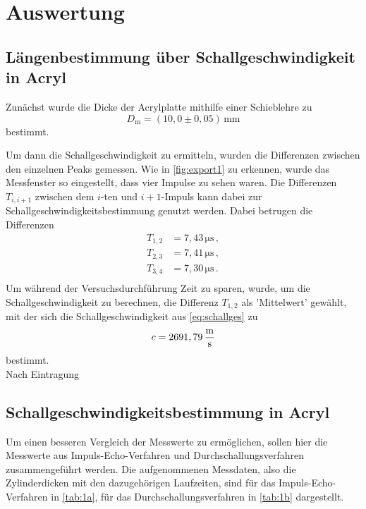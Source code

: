 \section{Auswertung}
\label{sec:auswertung}

\subsection{Längenbestimmung über Schallgeschwindigkeit in Acryl}

Zunächst wurde die Dicke der Acrylplatte mithilfe einer Schieblehre zu
\begin{equation*}
    D_\text{m} = (10,0 \pm 0,05) \,\unit{\milli\meter}
\end{equation*}
bestimmt.

Um dann die Schallgeschwindigkeit zu ermitteln, wurden die Differenzen zwischen den einzelnen Peaks gemessen.
Wie in \autoref{fig:export1} zu erkennen, wurde das Messfenster so eingestellt, dass vier Impulse zu sehen waren.
Die Differenzen $T_{i,i+1}$ zwischen dem $i$-ten und $i + 1$-Impuls kann dabei zur Schallgeschwindigkeitsbestimmung genutzt werden.
Dabei betrugen die Differenzen
\begin{align*}
    T_{1,2} &= 7,43 \,\unit{\micro\second} \,,\\
    T_{2,3} &= 7,41 \,\unit{\micro\second} \,,\\
    T_{3,4} &= 7,30 \,\unit{\micro\second} \,.\\
\end{align*}
Um während der Versuchsdurchführung Zeit zu sparen, wurde, um die Schallgeschwindigkeit zu berechnen, die Differenz $T_{1,2}$ als 'Mittelwert' gewählt,
mit der sich die Schallgeschwindigkeit aus \eqref{eq:schallges} zu
\begin{equation*}
    c = 2691,79 \,\unit{\frac{\meter}{\second}}
\end{equation*}
bestimmt. \\

Nach Eintragung

\subsection{Schallgeschwindigkeitsbestimmung in Acryl}

Um einen besseren Vergleich der Messwerte zu ermöglichen, sollen hier die Messwerte aus Impuls-Echo-Verfahren und Durchschallungsverfahren zusammengeführt werden.
Die aufgenommenen Messdaten, also die Zylinderdicken mit den dazugehörigen Laufzeiten, sind für das Impuls-Echo-Verfahren in \autoref{tab:1a}, für das Durchschallungsverfahren in \autoref{tab:1b} dargestellt.

